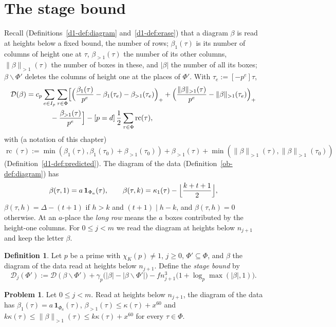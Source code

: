 \documentclass[reqno]{amsart}
\newcounter{chap}
\theoremstyle{plain}
\theoremstyle{definition}
\newtheorem{problem}{Problem}[section]
\newtheorem{definition}[theorem]{Definition}
\theoremstyle{remark}
\newcommand{\Dc}{\mathcal D}
\newcommand{\nb}[1]{\lVert #1 \rVert}
\newcommand{\bo}{\beta_1}
\newcommand{\bl}{\beta_{>1}}
\newcommand{\bb}{\nb{\beta}_{>1}}
\begin{document}
\section{The stage bound}\label{sec:stage}

Recall (Definitions~\ref{d1-def:diagram} and~\ref{d1-def:erase}) that a diagram \(\beta\) is read at heights below a fixed bound, the number of rows; \(\bo(\tau)\) is its number of columns of height one at \(\tau\), \(\bl(\tau)\) the number of its other columns, \(\bb(\tau)\) the number of boxes in these, and \(\lvert\beta\rvert\) the number of all its boxes; \(\beta \smallsetminus \Phi'\) deletes the columns of height one at the places of \(\Phi'\).  With \(\tau_e := [-p^e]\tau\),
\[
\begin{aligned}
  \Dc(\beta) ={}& c_p \sum_{e \in I_p} \sum_{\tau \in \Phi} \Bigl[ \Bigl(\frac{\bo(\tau)}{p^e} - \bo(\tau_e) - \bl(\tau_e)\Bigr)_+ + \Bigl(\frac{\bb(\tau)}{p^e} - \bb(\tau_e)\Bigr)_+ \\
  &\qquad - \frac{\bl(\tau)}{p^e} \Bigr] - [p = d]\, \frac12 \sum_{\tau \in \Phi} \operatorname{rc}(\tau) ,
\end{aligned}
\]
with (a notation of this chapter) \(\operatorname{rc}(\tau) := \min(\bo(\tau), \bo(\tau_0) + \bl(\tau_0)) + \bl(\tau) + \min(\bb(\tau), \bb(\tau_0))\) (Definition~\ref{d1-def:predicted}).  The diagram of the data (Definition~\ref{ob-def:diagram}) has
\[
  \beta(\tau, 1) = a\,\mathbf 1_{\Phi_a}(\tau), \qquad \beta(\tau, k) = \kappa_1(\tau) - \Bigl\lfloor \frac{k + t + 1}{2} \Bigr\rfloor,
\]
\(\beta(\tau, h) = \Delta - (t + 1)\) if \(h > k\) and \((t+1) \mid h - k\),
and \(\beta(\tau, h) = 0\) otherwise.  At an \(a\)-place the \emph{long row} means the \(a\) boxes contributed by the height-one columns.  For \(0 \le j < m\) we read the diagram at heights below \(n_{j+1}\) and keep the letter \(\beta\).

\begin{definition}\label{def:stage}
Let \(p\) be a prime with \(\chi_K(p) \ne 1\), \(j \ge 0\), \(\Phi' \subseteq \Phi\), and \(\beta\) the diagram of the data read at heights below \(n_{j+1}\).  Define the \emph{stage bound} by
\[
  \Dc_j(\Phi') := \Dc(\beta \smallsetminus \Phi') + \gamma_p\bigl(\lvert\beta\rvert - \lvert\beta \smallsetminus \Phi'\rvert\bigr) - f n_{j+1}^3 \bigl(1 + \log_p \max(\lvert\beta\rvert, 1)\bigr) .
\]
\end{definition}

\begin{problem}\label{pr:diagram}
Let \(0 \le j < m\).  Read at heights below \(n_{j+1}\), the diagram of the data has \(\bo(\tau) = a\,\mathbf 1_{\Phi_a}(\tau)\), \(\bl(\tau) \le \kappa(\tau) + x^{60}\) and \(k\kappa(\tau) \le \bb(\tau) \le k\kappa(\tau) + x^{60}\) for every \(\tau \in \Phi\).
\end{problem}
\end{document}
